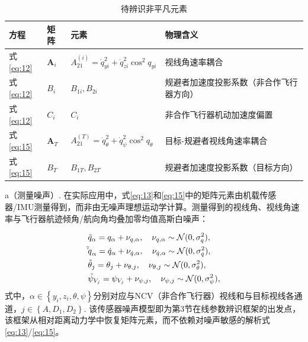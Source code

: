 \begin{table}[htbp]
\centering
\caption{待辨识非平凡元素}
\label{tab:nontrivial}
\small
\begin{tabularx}{\linewidth}{lXXX}
\toprule
方程 & 矩阵 & 元素 & 物理含义 \\
\midrule
式\eqref{eq:12} & ${{\mathbf{A}}_i}$ & $A_{21}^{(i)} = \dot q_{yi}^2 + \dot q_{zi}^2{\cos ^2}{q_{yi}}$ & 视线角速率耦合 \\
式\eqref{eq:12} & ${B_i}$ & ${B_{1i}},{B_{2i}}$ & 规避者加速度投影系数（非合作飞行器方向） \\
式\eqref{eq:12} & ${C_i}$ & ${C_i}$ & 非合作飞行器机动加速度偏置 \\
式\eqref{eq:15} & ${{\mathbf{A}}_T}$ & $A_{21}^{(T)} = \dot q_\theta ^2 + \dot q_\psi ^2{\cos ^2}{q_\theta }$ & 目标-规避者视线角速率耦合 \\
式\eqref{eq:15} & ${B_T}$ & ${B_{1T}},{B_{2T}}$ & 规避者加速度投影系数（目标方向） \\
\bottomrule
\end{tabularx}
\end{table}
\begin{remark}
a（测量噪声）. 在实际应用中，式\eqref{eq:13}和\eqref{eq:15}中的矩阵元素由机载传感器/IMU测量得到，而非由无噪声理想运动学计算。测量得到的视线角、视线角速率与飞行器航迹倾角/航向角均叠加零均值高斯白噪声：
\end{remark}
\begin{equation}
\label{eq:16}
\begin{gathered}
  {{\tilde q}_\alpha } = {q_\alpha } + {\nu _{q,\alpha }},\quad {\nu _{q,\alpha }}\sim \mathcal{N}(0,\sigma _q^2), \hfill \\
  {{\tilde \dot q}_\alpha } = {{\dot q}_\alpha } + {\nu _{\dot q,\alpha }},\quad {\nu _{\dot q,\alpha }}\sim \mathcal{N}(0,\sigma _{\dot q}^2), \hfill \\
  {{\tilde \theta }_j} = {\theta _j} + {\nu _{\theta ,j}},\quad {\nu _{\theta ,j}}\sim \mathcal{N}(0,\sigma _\theta ^2), \hfill \\
  {{\tilde \psi }_{{V_j}}} = {\psi _{{V_j}}} + {\nu _{\psi ,j}},\quad {\nu _{\psi ,j}}\sim \mathcal{N}(0,\sigma _\psi ^2), \hfill \\ 
\end{gathered}
\end{equation}
式中，$\alpha  \in \left\{ {{y_i},{z_i},\theta ,\psi } \right\}$分别对应与NCV（非合作飞行器）视线和与目标视线各通道，$j \in \left\{ {A,{D_1},{D_2}} \right\}$. 该传感器噪声模型即为第3节在线参数辨识框架的出发点，该框架从相对距离动力学中恢复矩阵元素，而不依赖对噪声敏感的解析式\eqref{eq:13}/\eqref{eq:15}。

